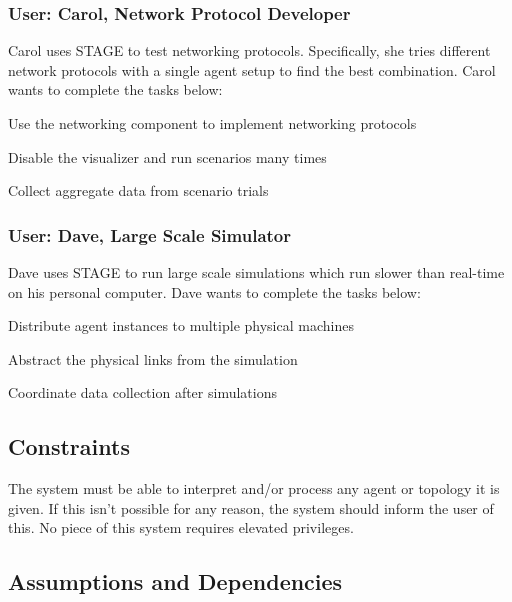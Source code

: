 \documentclass[titlepage]{article}
\begin{document}
\subsubsection{User: Carol, Network Protocol Developer%
  \label{bob}%
}

Carol uses STAGE to test networking protocols.  Specifically, she tries different network protocols with a single agent
setup to find the best combination.  Carol wants to complete the tasks below:

\begin{itemize*}
    \item Use the networking component to implement networking protocols
    \item Disable the visualizer and run scenarios many times
    \item Collect aggregate data from scenario trials
\end{itemize*}

\subsubsection{User: Dave, Large Scale Simulator%
  \label{bob}%
}

Dave uses STAGE to run large scale simulations which run slower than real-time on his personal computer.  Dave wants to
complete the tasks below:

\begin{itemize*}
    \item Distribute agent instances to multiple physical machines
    \item Abstract the physical links from the simulation
    \item Coordinate data collection after simulations
\end{itemize*}

\subsection{Constraints%
  \label{constraints}%
}

The system must be able to interpret and/or process any agent or topology it is given.  If this isn't possible for any reason, the system should inform the user of this. No piece of this system requires elevated privileges.


\subsection{Assumptions and Dependencies%
  \label{assumptions-and-dependencies}%
}
\end{document}

